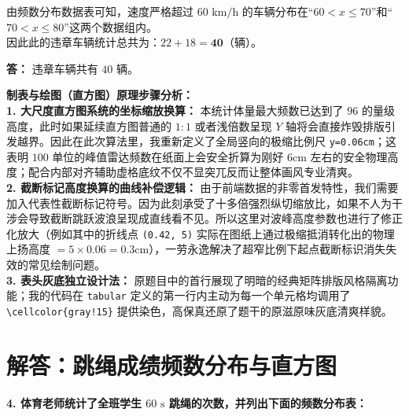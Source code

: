\vspace{0.2cm}

由频数分布数据表可知，速度严格超过 $60\text{ km/h}$ 的车辆分布在“$60 < x \leqslant 70$”和“$70 < x \leqslant 80$”这两个数据组内。\\
因此此的违章车辆统计总共为：$22 + 18 = \boldsymbol{40}$（辆）。

\textbf{答：} 违章车辆共有 $40$ 辆。

\vspace{0.6cm}

{\small\color{blue!70!black}
\textbf{制表与绘图（直方图）原理步骤分析：}\\
\textbf{1. 大尺度直方图系统的坐标缩放换算：} 本统计体量最大频数已达到了 $96$ 的量级高度，此时如果延续直方图普通的 $1:1$ 或者浅倍数呈现 $Y$ 轴将会直接炸毁排版引发越界。因此在此次算法里，我重新定义了全局竖向的极缩比例尺 \texttt{y=0.06cm}；这表明 $100$ 单位的峰值雷达频数在纸面上会安全折算为刚好 $6\text{cm}$ 左右的安全物理高度；配合内部对齐辅助虚格底纹不仅不显突兀反而让整体画风专业清爽。\\
\textbf{2. 截断标记高度换算的曲线补偿逻辑：} 由于前端数据的非零首发特性，我们需要加入代表性截断标记符号。因为此刻承受了十多倍强烈纵切缩放比，如果不人为干涉会导致截断跳跃波浪呈现成直线看不见。所以这里对波峰高度参数也进行了修正化放大（例如其中的折线点 \texttt{(0.42, 5)} 实际在图纸上通过极缩抵消转化出的物理上扬高度 $= 5 \times 0.06 = 0.3\text{cm}$），一劳永逸解决了超窄比例下起点截断标识消失失效的常见绘制问题。\\
\textbf{3. 表头灰底独立设计法：} 原题目中的首行展现了明暗的经典矩阵排版风格隔离功能；我的代码在 \texttt{tabular} 定义的第一行内主动为每一个单元格均调用了 \texttt{\textbackslash cellcolor\{gray!15\}} 提供染色，高保真还原了题干的原滋原味灰底清爽样貌。
}

\newpage



\section{解答：跳绳成绩频数分布与直方图}

\vspace{0.6cm}

\textbf{4. 体育老师统计了全班学生 $60\text{ s}$ 跳绳的次数，并列出下面的频数分布表：}

